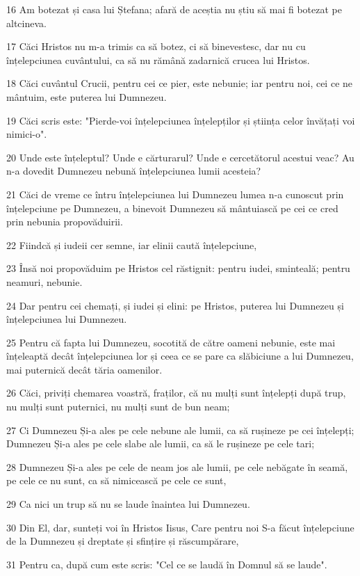 \par 16 Am botezat și casa lui Ștefana; afară de aceștia nu știu să mai fi botezat pe altcineva.
\par 17 Căci Hristos nu m-a trimis ca să botez, ci să binevestesc, dar nu cu înțelepciunea cuvântului, ca să nu rămână zadarnică crucea lui Hristos.
\par 18 Căci cuvântul Crucii, pentru cei ce pier, este nebunie; iar pentru noi, cei ce ne mântuim, este puterea lui Dumnezeu.
\par 19 Căci scris este: "Pierde-voi înțelepciunea înțelepților și știința celor învățați voi nimici-o".
\par 20 Unde este înțeleptul? Unde e cărturarul? Unde e cercetătorul acestui veac? Au n-a dovedit Dumnezeu nebună înțelepciunea lumii acesteia?
\par 21 Căci de vreme ce întru înțelepciunea lui Dumnezeu lumea n-a cunoscut prin înțelepciune pe Dumnezeu, a binevoit Dumnezeu să mântuiască pe cei ce cred prin nebunia propovăduirii.
\par 22 Fiindcă și iudeii cer semne, iar elinii caută înțelepciune,
\par 23 Însă noi propovăduim pe Hristos cel răstignit: pentru iudei, sminteală; pentru neamuri, nebunie.
\par 24 Dar pentru cei chemați, și iudei și elini: pe Hristos, puterea lui Dumnezeu și înțelepciunea lui Dumnezeu.
\par 25 Pentru că fapta lui Dumnezeu, socotită de către oameni nebunie, este mai înțeleaptă decât înțelepciunea lor și ceea ce se pare ca slăbiciune a lui Dumnezeu, mai puternică decât tăria oamenilor.
\par 26 Căci, priviți chemarea voastră, fraților, că nu mulți sunt înțelepți după trup, nu mulți sunt puternici, nu mulți sunt de bun neam;
\par 27 Ci Dumnezeu Și-a ales pe cele nebune ale lumii, ca să rușineze pe cei înțelepți; Dumnezeu Și-a ales pe cele slabe ale lumii, ca să le rușineze pe cele tari;
\par 28 Dumnezeu Și-a ales pe cele de neam jos ale lumii, pe cele nebăgate în seamă, pe cele ce nu sunt, ca să nimicească pe cele ce sunt,
\par 29 Ca nici un trup să nu se laude înaintea lui Dumnezeu.
\par 30 Din El, dar, sunteți voi în Hristos Iisus, Care pentru noi S-a făcut înțelepciune de la Dumnezeu și dreptate și sfințire și răscumpărare,
\par 31 Pentru ca, după cum este scris: "Cel ce se laudă în Domnul să se laude".

